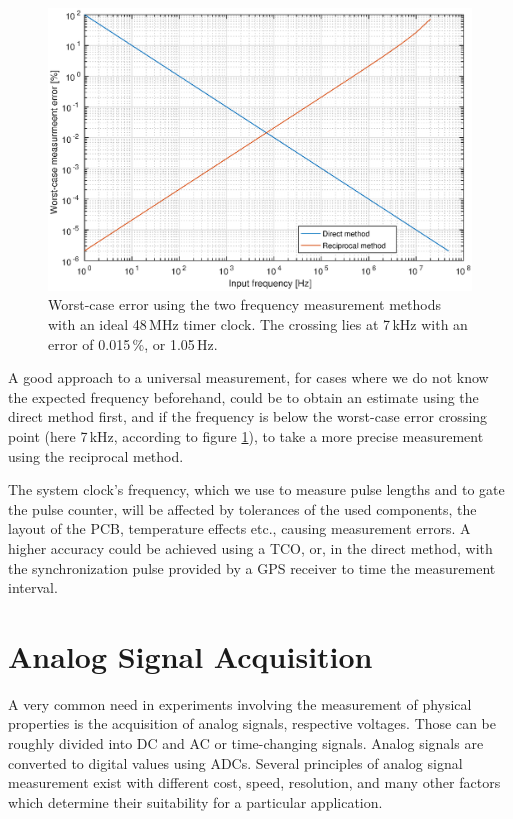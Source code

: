 \begin{figure}[h]
	\centering
	\includegraphics[width=\textwidth] {img/freqmethods.eps}
	\caption[Frequency measurement methods comparison]{\label{fig:freqmethods-graph}Worst-case error using the two frequency measurement methods with an ideal 48\,MHz timer clock. The crossing lies at 7\,kHz with an error of 0.015\,\%, or 1.05\,Hz.}
\end{figure}

A good approach to a universal measurement, for cases where we do not know the expected frequency beforehand, could be to obtain an estimate using the direct method first, and if the frequency is below the worst-case error crossing point (here 7\,kHz, according to figure \ref{fig:freqmethods-graph}), to take a more precise measurement using the reciprocal method.

The system clock's frequency, which we use to measure pulse lengths and to gate the pulse counter, will be affected by tolerances of the used components, the layout of the \gls{PCB}, temperature effects etc., causing measurement errors. A higher accuracy could be achieved using a \gls{TCO}, or, in the direct method, with the synchronization pulse provided by a \gls{GPS} receiver to time the measurement interval.

\section{Analog Signal Acquisition} \label{sec:theory-adc}

A very common need in experiments involving the measurement of physical properties is the acquisition of analog signals, respective voltages. Those can be roughly divided into \gls{DC} and \gls{AC} or time-changing signals. Analog signals are converted to digital values using \glspl{ADC}. Several principles of analog signal measurement exist with different cost, speed, resolution, and many other factors which determine their suitability for a particular application.

